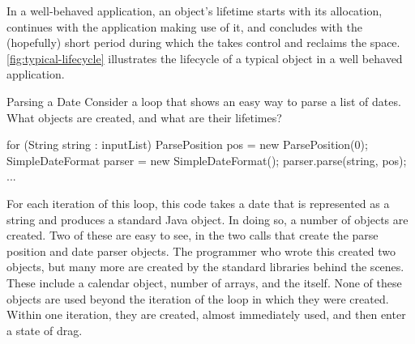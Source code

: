 In a well-behaved application, an object's lifetime starts with its allocation,
continues with the application making use of it, and concludes with the
(hopefully) short period during which the \jre takes control and reclaims the
space. \autoref{fig:typical-lifecycle} illustrates the lifecycle of a typical
object in a well behaved application.


\begin{example}{Parsing a Date}
Consider a loop that shows an easy way to parse
a list of dates. What objects are created, and what are their lifetimes?
\begin{center}
\begin{minipage}{0.74\textwidth}
\begin{framedlisting}
for (String string : inputList) {
  ParsePosition pos = new ParsePosition(0);
  SimpleDateFormat parser = new SimpleDateFormat();
  parser.parse(string, pos);
  ...
}
\end{framedlisting}
\end{minipage}
\end{center}
\end{example}

For each iteration of this loop, this code takes a date that is represented as a
string and produces a standard Java  object. In doing so, a number
of objects are created. Two of these are easy to see, in the two 
calls that create the parse position and date parser objects. The programmer who
wrote this created two objects, but many more are created by the standard
libraries behind the scenes. These include a calendar object, number of arrays,
and the  itself. None of these objects are used beyond the iteration
of the loop in which they were created. Within one iteration, they are created,
almost immediately used, and then enter a state of drag.


